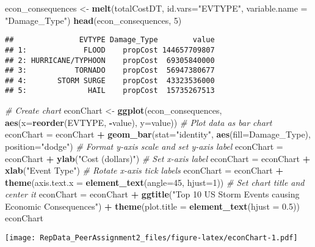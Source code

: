 \documentclass[
]{article}
\newenvironment{Shaded}{\begin{snugshade}}{\end{snugshade}}
\newcommand{\CommentTok}[1]{\textcolor[rgb]{0.56,0.35,0.01}{\textit{#1}}}
\newcommand{\DataTypeTok}[1]{\textcolor[rgb]{0.13,0.29,0.53}{#1}}
\newcommand{\DecValTok}[1]{\textcolor[rgb]{0.00,0.00,0.81}{#1}}
\newcommand{\FloatTok}[1]{\textcolor[rgb]{0.00,0.00,0.81}{#1}}
\newcommand{\KeywordTok}[1]{\textcolor[rgb]{0.13,0.29,0.53}{\textbf{#1}}}
\newcommand{\NormalTok}[1]{#1}
\newcommand{\OperatorTok}[1]{\textcolor[rgb]{0.81,0.36,0.00}{\textbf{#1}}}
\newcommand{\StringTok}[1]{\textcolor[rgb]{0.31,0.60,0.02}{#1}}
\begin{document}
\begin{Shaded}
\begin{Highlighting}[]
\NormalTok{econ_consequences <-}\StringTok{ }\KeywordTok{melt}\NormalTok{(totalCostDT, }\DataTypeTok{id.vars=}\StringTok{"EVTYPE"}\NormalTok{, }\DataTypeTok{variable.name =} \StringTok{"Damage_Type"}\NormalTok{)}
\KeywordTok{head}\NormalTok{(econ_consequences, }\DecValTok{5}\NormalTok{)}
\end{Highlighting}
\end{Shaded}

\begin{verbatim}
##               EVTYPE Damage_Type        value
## 1:             FLOOD    propCost 144657709807
## 2: HURRICANE/TYPHOON    propCost  69305840000
## 3:           TORNADO    propCost  56947380677
## 4:       STORM SURGE    propCost  43323536000
## 5:              HAIL    propCost  15735267513
\end{verbatim}

\begin{Shaded}
\begin{Highlighting}[]
\CommentTok{# Create chart}
\NormalTok{econChart <-}\StringTok{ }\KeywordTok{ggplot}\NormalTok{(econ_consequences, }\KeywordTok{aes}\NormalTok{(}\DataTypeTok{x=}\KeywordTok{reorder}\NormalTok{(EVTYPE, }\OperatorTok{-}\NormalTok{value), }\DataTypeTok{y=}\NormalTok{value))}
\CommentTok{# Plot data as bar chart}
\NormalTok{econChart =}\StringTok{ }\NormalTok{econChart }\OperatorTok{+}\StringTok{ }\KeywordTok{geom_bar}\NormalTok{(}\DataTypeTok{stat=}\StringTok{"identity"}\NormalTok{, }\KeywordTok{aes}\NormalTok{(}\DataTypeTok{fill=}\NormalTok{Damage_Type), }\DataTypeTok{position=}\StringTok{"dodge"}\NormalTok{)}
\CommentTok{# Format y-axis scale and set y-axis label}
\NormalTok{econChart =}\StringTok{ }\NormalTok{econChart }\OperatorTok{+}\StringTok{ }\KeywordTok{ylab}\NormalTok{(}\StringTok{"Cost (dollars)"}\NormalTok{) }
\CommentTok{# Set x-axis label}
\NormalTok{econChart =}\StringTok{ }\NormalTok{econChart }\OperatorTok{+}\StringTok{ }\KeywordTok{xlab}\NormalTok{(}\StringTok{"Event Type"}\NormalTok{) }
\CommentTok{# Rotate x-axis tick labels }
\NormalTok{econChart =}\StringTok{ }\NormalTok{econChart }\OperatorTok{+}\StringTok{ }\KeywordTok{theme}\NormalTok{(}\DataTypeTok{axis.text.x =} \KeywordTok{element_text}\NormalTok{(}\DataTypeTok{angle=}\DecValTok{45}\NormalTok{, }\DataTypeTok{hjust=}\DecValTok{1}\NormalTok{))}
\CommentTok{# Set chart title and center it}
\NormalTok{econChart =}\StringTok{ }\NormalTok{econChart }\OperatorTok{+}\StringTok{ }\KeywordTok{ggtitle}\NormalTok{(}\StringTok{"Top 10 US Storm Events causing Economic Consequences"}\NormalTok{) }\OperatorTok{+}\StringTok{ }\KeywordTok{theme}\NormalTok{(}\DataTypeTok{plot.title =} \KeywordTok{element_text}\NormalTok{(}\DataTypeTok{hjust =} \FloatTok{0.5}\NormalTok{))}
\NormalTok{econChart}
\end{Highlighting}
\end{Shaded}

\texttt{[image: RepData\_PeerAssignment2\_files/figure-latex/econChart-1.pdf]}
\end{document}
